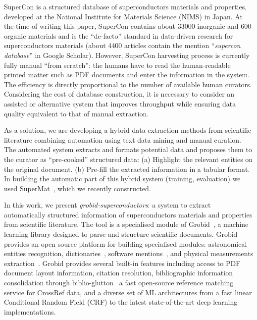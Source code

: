 \documentclass{article}
\begin{document}
SuperCon is a structured database of superconductors materials and properties, developed at the National Institute for Materials Science (NIMS) in Japan. 
At the time of writing this paper, SuperCon contains about 33000 inorganic and 600 organic materials and is the ``de-facto'' standard in data-driven research for superconductors materials  (about 4400 articles contain the mention ``\textit{supercon database}'' in Google Scholar). 
However, SuperCon harvesting process is currently fully manual ``from scratch'': the humans have to read the human-readable printed matter such as PDF documents and enter the information in the system. 
The efficiency is directly proportional to the number of available human curators.
Considering the cost of database construction, it is necessary to consider an assisted or alternative system that improves throughput while ensuring data quality equivalent to that of manual extraction.

As a solution, we are developing a hybrid data extraction methods from scientific literature combining automation using text data mining and manual curation.
The automated system extracts and formats potential data and proposes them to the curator as ``pre-cooked'' structured data: (a) Highlight the relevant entities on the original document. 
(b) Pre-fill the extracted information in a tabular format.
In building the automatic part of this hybrid system (training, evaluation) we used SuperMat~\cite{foppiano2021supermat}, which we recently constructed. 

In this work, we present \textit{grobid-superconductors}: a system to extract automatically structured information of superconductors materials and properties from scientific literature. 
The tool is a specialised module of Grobid~\cite{GROBID}, a machine learning library designed to parse and structure scientific documents. 
Grobid provides an open source platform for building specialised modules: astronomical entities recognition\cite{grobid-astro}, dictionaries~\cite{khemakhem:hal-01508868}, software mentions~\cite{lopez2021mining}, and physical measurements extraction~\cite{foppiano2019quantities}.
Grobid provides several built-in features including access to PDF document layout information, citation resolution, bibliographic information consolidation through biblio-glutton~\cite{biblio-glutton-lookup} a fast open-source reference matching service for CrossRef data, and a diverse set of ML architectures from a fast linear Conditional Random Field (CRF) to the latest state-of-the-art deep learning implementations.
\end{document}
